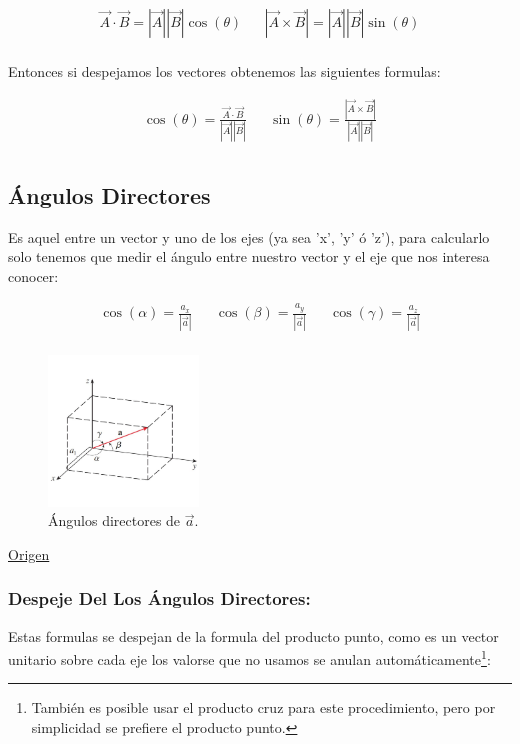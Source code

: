 \documentclass{article}
\begin{document}
\[ \begin{aligned}
 \vec{A}\cdot\vec{B} = |\vec{A}||\vec{B}| \cos(\theta) && |\vec{A}\times\vec{B}| = |\vec{A}||\vec{B}| \sin(\theta) \\
\end{aligned} \]

Entonces si despejamos los vectores obtenemos las siguientes formulas:

\[ \begin{aligned}
\cos(\theta) = \frac{\vec{A} \cdot \vec{B}}{|\vec{A}||\vec{B}|} &&
\sin(\theta) = \frac{|\vec{A}\times\vec{B}|}{|\vec{A}||\vec{B}|} \\
\end{aligned} \]

\subsection{Ángulos Directores}
\label{sec:orgbcc87b6}
Es aquel entre un vector y uno de los ejes (ya sea 'x', 'y' ó 'z'), para calcularlo solo tenemos que medir el ángulo entre nuestro vector y el eje que nos interesa conocer:

\[\begin{aligned}
  \cos(\alpha) = \frac{a_x}{|\vec{a}|} &&
  \cos(\beta)  = \frac{a_y}{|\vec{a}|} &&
  \cos(\gamma) = \frac{a_z}{|\vec{a}|} \\
\end{aligned} \]

\begin{figure}[htbp]
\centering
\includegraphics[width=4cm]{img/angulos-directores.png}
\caption{Ángulos directores de \(\vec{a}\).}
\end{figure}

\href{https://www.superprof.es/diccionario/matematicas/analitica/cosenos-directores.html}{Origen}

\subsubsection*{Despeje Del Los Ángulos Directores:}
\label{sec:org027a0a0}
Estas formulas se despejan de la formula del producto punto, como es un vector unitario sobre cada eje los valorse que no usamos se anulan automáticamente\footnote{También es posible usar el producto cruz para este procedimiento, pero por simplicidad se prefiere el producto punto.}:
\end{document}
